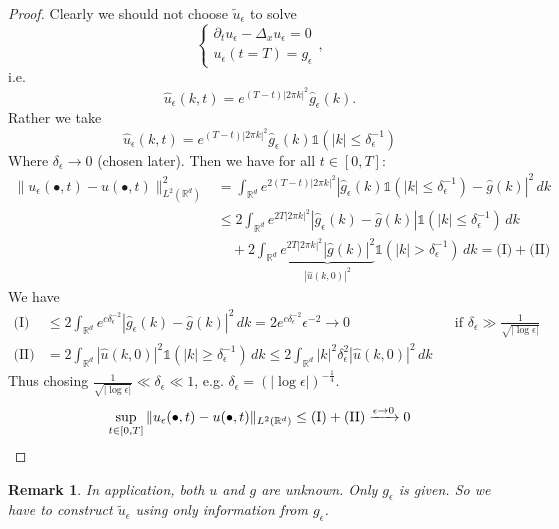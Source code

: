\documentclass{report}
\theoremstyle{tommy}
\newtheorem{rem}[defn]{Remark}
\begin{document}
	\begin{proof}
		Clearly we should not choose \(\tilde u_\epsilon\) to solve 
		\[\begin{cases}
			\partial_t u_\epsilon - \Delta_x u_\epsilon = 0 \\
			u_\epsilon(t = T) = g_\epsilon
		\end{cases},\]
		i.e. \[\hat u_\epsilon(k,t) = e^{(T-t)|2\pi k|^2}\hat g_\epsilon(k).\]
		Rather we take 
		\[\hat u_\epsilon(k,t) = e^{(T-t)|2 \pi k|^2} \hat g_\epsilon(k) \mathbb{1}(|k| \le \delta_\epsilon^{-1})\]
		Where \(\delta_\epsilon \to 0\) (chosen later). Then we have for all \(t \in [0,T]\):
		\begin{align*}
			\|u_\epsilon(\bullet,t) - u(\bullet, t)\|_{L^2(\mathbb{R}^d)}^2 &= \int_{\mathbb{R}^d} e^{2(T-t)|2 \pi k|^2} |\hat g_\epsilon(k) \mathbb{1}(|k|\le \delta_\epsilon^{-1}) - \hat g(k)|^2 \, dk \\
			&\le 2 \int_{\mathbb{R}^d} e^{2 T|2 \pi k|^2} |\hat g_\epsilon(k) - \hat g (k)| \mathbb{1}(|k|\le \delta_\epsilon^{-1}) \, dk \\
			&\quad + 2 \int_{\mathbb{R}^d} \underbrace{e^{2 T |2 \pi k|^2}|\hat g(k)|^2}_{|\hat u(k,0)|^2} \mathbb{1}(|k| > \delta_\epsilon^{-1}) \, dk
			= \text{(I)} + \text{(II)}
		\end{align*}
		We have 
		\begin{align*}
			\text{(I)} &\le 2 \int_{\mathbb{R}^d} e^{c\delta_\epsilon^{-2}} |\hat g_\epsilon(k) - \hat g (k)|^2 \, dk = 2 e^{c \delta_\epsilon^{-2}} \epsilon^{-2} \longrightarrow 0 &&\text{if \(\delta_\epsilon \gg \frac{1}{\sqrt{|\log \epsilon|}}\)} \\
			\text{(II)} &= 2 \int_{\mathbb{R}^d} |\hat u(k,0)|^2 \mathbb{1}(|k| \ge \delta_\epsilon^{-1}) \, dk
			\le 2 \int_{\mathbb{R}^d} |k|^2 \delta_\epsilon^2 |\hat u(k,0)|^2 \, dk
		\end{align*}
		Thus chosing \(\frac{1}{\sqrt{|\log \epsilon|}} \ll \delta_\epsilon \ll 1\), e.g. \(\delta_\epsilon = (|\log \epsilon|)^{-\frac{1}{4}}\).
		\[\sup_{t \in [0,T]} \|u_\epsilon(\bullet, t) - u(\bullet, t)\|_{L^2(\mathbb{R}^d)} \le \text{(I)} + \text{(II)} \xrightarrow{\epsilon \to 0} 0 \qedhere\]
	\end{proof}

	\begin{rem}
		In application, both \(u\) and \(g\) are unknown. Only \(g_\epsilon\) is given. So we have to construct \(\tilde u_\epsilon\) using only information from \(g_\epsilon\).
	\end{rem}
\end{document}
